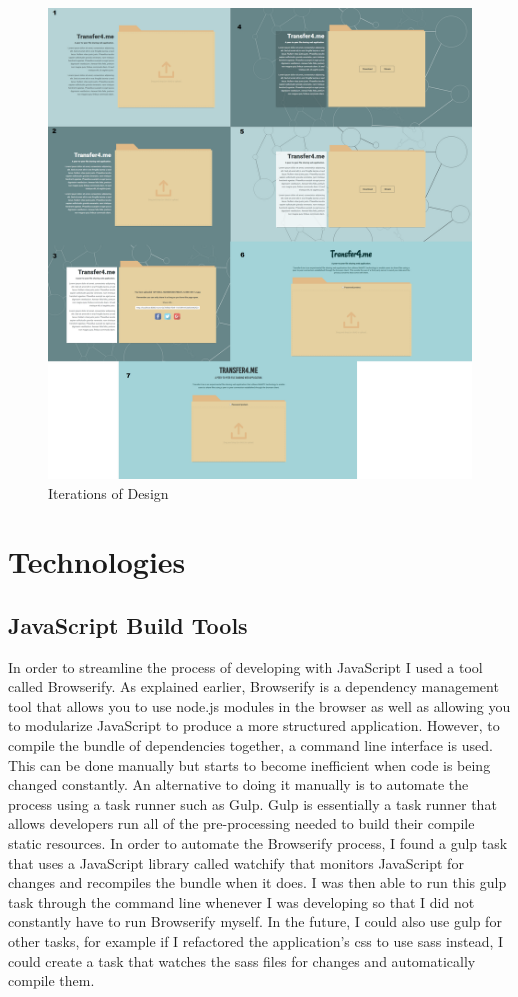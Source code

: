 \documentclass[]{report}
\begin{document}
			\begin{figure}[H]
				\caption{Iterations of Design}
				\centering
				\includegraphics[scale=0.15]{design.png}
			\end{figure}
		
		\section{Technologies}
			\subsection{JavaScript Build Tools}
			In order to streamline the process of developing with JavaScript I used a tool called Browserify. As explained earlier, Browserify is a dependency management tool that allows you to use node.js modules in the browser as well as allowing you to modularize JavaScript to produce a more structured application. However, to compile the bundle of dependencies together, a command line interface is used. This can be done manually but starts to become inefficient when code is being changed constantly. An alternative to doing it manually is to automate the process using a task runner such as Gulp. Gulp is essentially a task runner that allows developers run all of the pre-processing needed to build their compile static resources. In order to automate the Browserify process, I found a gulp task that uses a JavaScript library called watchify that monitors JavaScript for changes and recompiles the bundle when it does. I was then able to run this gulp task through the command line whenever I was developing so that I did not constantly have to run Browserify myself. In the future, I could also use gulp for other tasks, for example if I refactored the application's css to use sass instead, I could create a task that watches the sass files for changes and automatically compile them.
			
\end{document}
